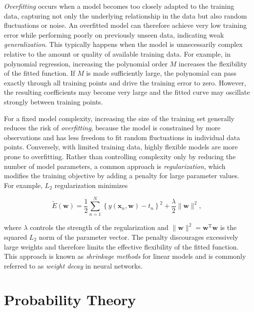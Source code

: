 \documentclass[10pt,twocolumn]{memoir}
\begin{document}
\textit{Overfitting} occurs when a model becomes too closely adapted to the training data, capturing not only the underlying relationship in the data but also random fluctuations or noise. An overfitted model can therefore achieve very low training error while performing poorly on previously unseen data, indicating weak \textit{generalization}. This typically happens when the model is unnecessarily complex relative to the amount or quality of available training data. For example, in polynomial regression, increasing the polynomial order $M$ increases the flexibility of the fitted function. If $M$ is made sufficiently large, the polynomial can pass exactly through all training points and drive the training error to zero. However, the resulting coefficients may become very large and the fitted curve may oscillate strongly between training points.

For a fixed model complexity, increasing the size of the training set generally reduces the risk of \textit{overfitting}, because the model is constrained by more observations and has less freedom to fit random fluctuations in individual data points. Conversely, with limited training data, highly flexible models are more prone to overfitting. Rather than controlling complexity only by reducing the number of model parameters, a common approach is \textit{regularization}, which modifies the training objective by adding a penalty for large parameter values. For example, $L_2$ regularization minimizes

\begin{equation}
    \widetilde{E}(\mathbf{w}) = \frac{1}{2}\sum_{n=1}^{N}\left\{y(\mathbf{x}_n,\mathbf{w}) - t_n \right\}^{2} + \frac{\lambda}{2}\|\mathbf{w}\|^{2},
\end{equation}

where $\lambda$ controls the strength of the regularization and $\|\mathbf{w}\|^2 = \mathbf{w}^{\mathrm{T}}\mathbf{w}$ is the squared $L_2$ norm of the parameter vector. The penalty discourages excessively large weights and therefore limits the effective flexibility of the fitted function. This approach is known as \textit{shrinkage methods} for linear models and is commonly referred to as \textit{weight decay} in neural networks.

\vspace{10pt}
\section{Probability Theory}
\end{document}
